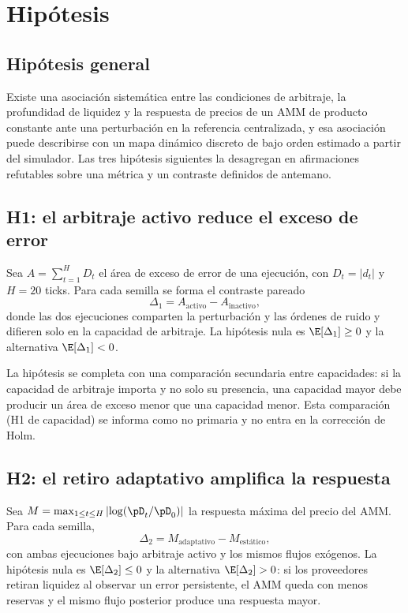 \chapter{Hipótesis}
\label{cap:hipotesis}

\section{Hipótesis general}

Existe una asociación sistemática entre las condiciones de arbitraje, la profundidad de liquidez y la respuesta de precios de un AMM de producto constante ante una perturbación en la referencia centralizada, y esa asociación puede describirse con un mapa dinámico discreto de bajo orden estimado a partir del simulador. Las tres hipótesis siguientes la desagregan en afirmaciones refutables sobre una métrica y un contraste definidos de antemano.

\section{H1: el arbitraje activo reduce el exceso de error}

Sea $A=\sum_{t=1}^{H} D_t$ el área de exceso de error de una ejecución, con $D_t=|d_t|$ y $H=20$ ticks. Para cada semilla se forma el contraste pareado
\[
\Delta_1 = A_{\text{activo}} - A_{\text{inactivo}},
\]
donde las dos ejecuciones comparten la perturbación y las órdenes de ruido y difieren solo en la capacidad de arbitraje. La hipótesis nula es $\E[\Delta_1]\ge 0$ y la alternativa $\E[\Delta_1]<0$.

La hipótesis se completa con una comparación secundaria entre capacidades: si la capacidad de arbitraje importa y no solo su presencia, una capacidad mayor debe producir un área de exceso menor que una capacidad menor. Esta comparación (H1 de capacidad) se informa como no primaria y no entra en la corrección de Holm.

\section{H2: el retiro adaptativo amplifica la respuesta}

Sea $M=\max_{1\le t\le H}\left|\log(\pD_t/\pD_0)\right|$ la respuesta máxima del precio del AMM. Para cada semilla,
\[
\Delta_2 = M_{\text{adaptativo}} - M_{\text{estático}},
\]
con ambas ejecuciones bajo arbitraje activo y los mismos flujos exógenos. La hipótesis nula es $\E[\Delta_2]\le 0$ y la alternativa $\E[\Delta_2]>0$: si los proveedores retiran liquidez al observar un error persistente, el AMM queda con menos reservas y el mismo flujo posterior produce una respuesta mayor.

